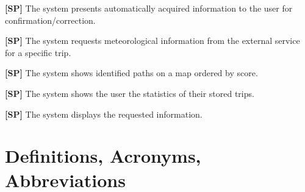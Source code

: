         
        \textbf{[SP\csp]} The system presents automatically acquired information to the user for confirmation/correction.



        \textbf{[SP\csp]} The system requests meteorological information from the external service for a specific trip.





        
        \textbf{[SP\csp]} The system shows identified paths on a map ordered by score.

        \textbf{[SP\csp]} The system shows the user the statistics of their stored trips.



        \textbf{[SP\csp]} The system displays the requested information.


\section{Definitions, Acronyms, Abbreviations}
\label{sec:definition_acronyms_abbreviations}

